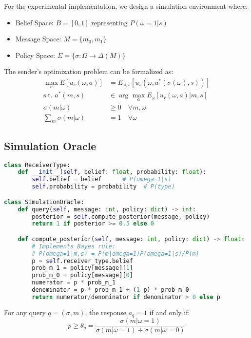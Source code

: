 \documentclass[12pt]{article}
\theoremstyle{plain}
\theoremstyle{definition}
\theoremstyle{remark}
\begin{document}
For the experimental implementation, we design a simulation environment where:
\begin{itemize}
    \item Belief Space: $B = [0,1]$ representing $P(\omega=1|s)$
    \item Message Space: $M = \{m_0, m_1\}$
    \item Policy Space: $\Sigma = \{\sigma: \Omega \rightarrow \Delta(M)\}$
\end{itemize}

The sender's optimization problem can be formalized as:
\begin{align*}
    \max_\sigma E[u_s(\omega,a)] &= E_{\omega,s}[u_s(\omega,a^*(\sigma(\omega),s))] \\
    \text{s.t. } a^*(m,s) &\in \arg\max_a E_\omega[u_r(\omega,a)|m,s] \\
    \sigma(m|\omega) &\geq 0 \quad \forall m,\omega \\
    \sum_m \sigma(m|\omega) &= 1 \quad \forall\omega
\end{align*}

\subsection{Simulation Oracle}

\begin{lstlisting}[language=Python, caption=Core Implementation Classes]
class ReceiverType:
    def __init__(self, belief: float, probability: float):
        self.belief = belief      # P(omega=1|s)
        self.probability = probability  # P(type)

class SimulationOracle:
    def query(self, message: int, policy: dict) -> int:
        posterior = self.compute_posterior(message, policy)
        return 1 if posterior >= 0.5 else 0

    def compute_posterior(self, message: int, policy: dict) -> float:
        # Implements Bayes rule:
        # P(omega=1|m,s) = P(m|omega=1)P(omega=1|s)/P(m)
        p = self.receiver_type.belief
        prob_m_1 = policy[message][1]
        prob_m_0 = policy[message][0]
        numerator = p * prob_m_1
        denominator = p * prob_m_1 + (1-p) * prob_m_0
        return numerator/denominator if denominator > 0 else p
\end{lstlisting}

For any query $q = (\sigma, m)$, the response $a_q = 1$ if and only if:
\begin{equation}
    p \geq \theta_q = \frac{\sigma(m|\omega=1)}{\sigma(m|\omega=1) + \sigma(m|\omega=0)}
\end{equation}
\end{document}

